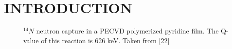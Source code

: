 \chapter{INTRODUCTION}
\label{ch:Intro}


\begin{figure}[h!]
\centering
\caption{$^{14}N$ neutron capture in a PECVD polymerized pyridine film. The Q-value of this reaction is 626 keV. Taken from [22]}\label{N}	
\end{figure}

